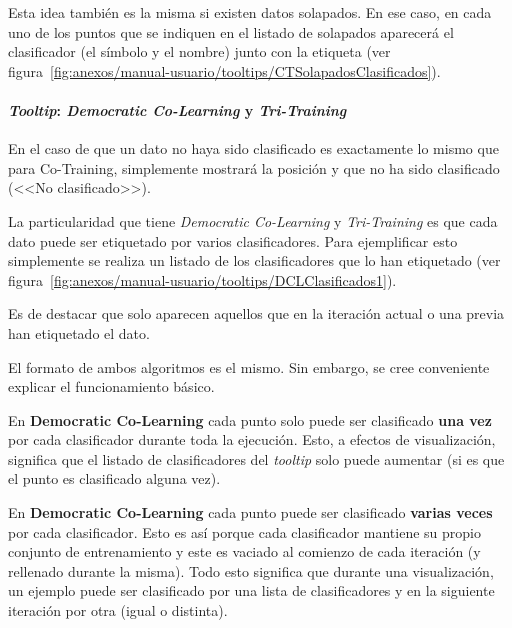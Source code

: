 
Esta idea también es la misma si existen datos solapados. En ese caso, en cada
uno de los puntos que se indiquen en el listado de solapados aparecerá el
clasificador (el símbolo y el nombre) junto con la etiqueta (ver
figura~\ref{fig:anexos/manual-usuario/tooltips/CTSolapadosClasificados}).


\paragraph{\textit{Tooltip}: \textit{Democratic Co-Learning} y \textit{Tri-Training}}

En el caso de que un dato no haya sido clasificado es exactamente lo mismo que
para Co-Training, simplemente mostrará la posición y que no ha sido clasificado
(<<No clasificado>>).

La particularidad que tiene \textit{Democratic Co-Learning} y
\textit{Tri-Training} es que cada dato puede ser etiquetado por varios
clasificadores. Para ejemplificar esto simplemente se realiza un listado de los
clasificadores que lo han etiquetado (ver
figura~\ref{fig:anexos/manual-usuario/tooltips/DCLClasificados1}).


Es de destacar que solo aparecen aquellos que en la iteración actual o una
previa han etiquetado el dato.

El formato de ambos algoritmos es el mismo. Sin embargo, se cree conveniente
explicar el funcionamiento básico.

En \textbf{Democratic Co-Learning} cada punto solo puede ser clasificado
\textbf{una vez} por cada clasificador durante toda la ejecución. Esto, a
efectos de visualización, significa que el listado de clasificadores del
\textit{tooltip} solo puede aumentar (si es que el punto es clasificado alguna
vez).

En \textbf{Democratic Co-Learning} cada punto puede ser clasificado
\textbf{varias veces} por cada clasificador. Esto es así porque cada
clasificador mantiene su propio conjunto de entrenamiento y este es vaciado al
comienzo de cada iteración (y rellenado durante la misma). Todo esto significa
que durante una visualización, un ejemplo puede ser clasificado por una lista de
clasificadores y en la siguiente iteración por otra (igual o distinta).

